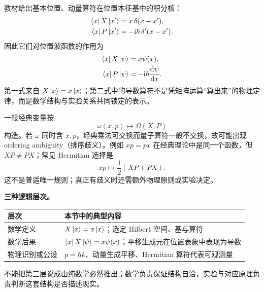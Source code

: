教材给出基本位置、动量算符在位置本征基中的积分核：
\begin{align}
  \left\langle x\right|X\left|x'\right\rangle
  &=x\,\delta(x-x'),
  \label{eq:QM-C04-S01-X-kernel}\\
  \left\langle x\right|P\left|x'\right\rangle
  &=-\mathrm{i}\hbar\,\delta'(x-x').
  \label{eq:QM-C04-S01-P-kernel}
\end{align}
因此它们对位置波函数的作用为
\begin{align}
  \left\langle x\right|X\left|\psi\right\rangle
  &=x\psi(x),
  \label{eq:QM-C04-S01-X-action}\\
  \left\langle x\right|P\left|\psi\right\rangle
  &=-\mathrm{i}\hbar\frac{\mathop{}\!\mathrm{d}\psi}{\mathop{}\!\mathrm{d} x}.
  \label{eq:QM-C04-S01-P-action}
\end{align}
第一式来自 $X\left|x\right\rangle=x\left|x\right\rangle$；第二式中的导数算符不是凭矩阵运算“算出来”的物理定律，而是数学结构与实验关系共同锁定的表示。


一般经典变量按
\begin{equation}
  \omega(x,p)\longmapsto\Omega(X,P)
  \label{eq:QM-C04-S01-quantization-map}
\end{equation}
构造。若 $\omega$ 同时含 $x,p$，经典乘法可交换而量子算符一般不交换，故可能出现 ordering ambiguity（排序歧义）。例如 $xp=px$ 在经典理论中是同一个函数，但 $XP\neq PX$；常见 Hermitian 选择是
\begin{equation}
  xp\longmapsto\frac12(XP+PX).
  \label{eq:QM-C04-S01-symmetric-ordering}
\end{equation}
这不是普适唯一规则；真正有歧义时还需额外物理原则或实验决定。

\textbf{三种逻辑层次。}
\begin{center}
\begin{tabularx}{0.95\textwidth}{@{}>{\raggedright\arraybackslash}p{2.5cm}X@{}}
  \toprule
  层次 & 本节中的典型内容 \\
  \midrule
  数学定义 & $X\left|x\right\rangle=x\left|x\right\rangle$；选定 Hilbert 空间、基与算符 \\
  数学后果 & $\left\langle x\right|X\left|\psi\right\rangle=x\psi(x)$；平移生成元在位置表象中表现为导数 \\
  物理识别或公设 & $p=\hbar k$、动量生成平移、Hermitian 算符代表可观测量 \\
  \bottomrule
\end{tabularx}
\end{center}
不能把第三层说成由纯数学必然推出；数学负责保证结构自洽，实验与对应原理负责判断这套结构是否描述现实。

